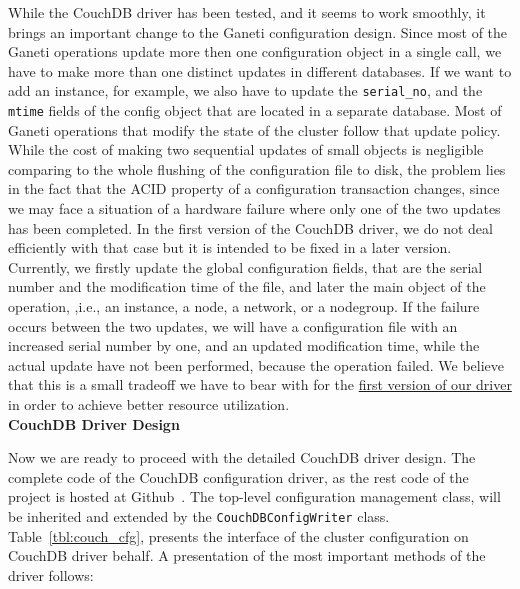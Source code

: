 \begin{description}
    While the CouchDB driver has been tested, and it seems to work smoothly, it
    brings an important change to the Ganeti configuration design. Since most of
    the Ganeti operations update more then one configuration object in a single
    call, we have to make more than one distinct updates in different databases.
    If we want to add an instance, for example, we also have to update the
    \texttt{serial\_no}, and the \texttt{mtime} fields of the config object that
    are located in a separate database. Most of Ganeti operations that modify
    the state of the cluster follow that update policy. While the cost of making
    two sequential updates of small objects is negligible comparing to the whole
    flushing of the configuration file to disk, the problem lies in the fact
    that the ACID property of a configuration transaction
    changes, since we may face a situation of a hardware failure where only
    one of the two updates has been completed. In the first version of the
    CouchDB driver, we do not deal efficiently with that case but it is intended
    to be fixed in a later version. Currently, we firstly update the global
    configuration fields, that are the serial number and the modification time
    of the file, and later the main object of the operation, ,i.e., an instance, a
    node, a network, or a nodegroup. If the failure occurs between the two
    updates, we will have a configuration file with an increased serial number
    by one, and an updated modification time, while the actual update have not
    been performed, because the operation failed. We believe that this is a
    small tradeoff we have to bear with for the \underline{first version of our
    driver} in order to achieve better resource utilization.\\

    \textbf{CouchDB Driver Design}

    Now we are ready to proceed with the detailed CouchDB driver design. The
    complete code of the CouchDB configuration driver, as the rest code of the
    project is hosted at Github~.
    The top-level configuration management class, will be inherited and extended
    by the \texttt{CouchDBConfigWriter} class. Table~\ref{tbl:couch_cfg},
    presents the interface of the cluster configuration on CouchDB driver
    behalf. A presentation of the most important methods of the driver follows:


\end{description}
